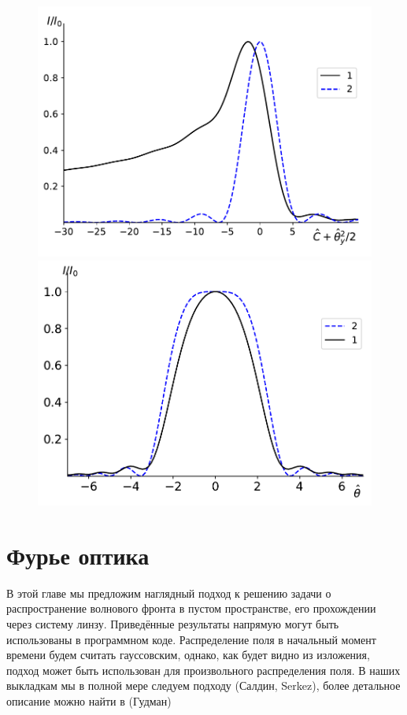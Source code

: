 \documentclass[14pt,a4paper]{extarticle}
\numberwithin{equation}{section}
\begin{document}
\begin{figure}
	\centering  
	\begin{minipage}{0.49\textwidth}
		\centering
		\includegraphics[width=\textwidth]{pic/spec_integ_emittance.pdf}
		\caption{}
		\label{fig:2spec_emittance_and_single}
	\end{minipage}\hfill
	\begin{minipage}{0.49\textwidth}
		\centering
		\includegraphics[width=\textwidth]{pic/angle_integ_emittance.pdf}
		\caption{}
		\label{fig:spec}
	\end{minipage}    
\end{figure}
\section{Фурье оптика}
В этой главе мы предложим наглядный подход к решению задачи о распространение волнового фронта в пустом пространстве, его прохождении через систему линзу. Приведённые результаты напрямую могут быть использованы в программном коде. Распределение поля в начальный момент времени будем считать гауссовским, однако, как будет видно из изложения, подход может быть использован для произвольного распределения поля. В наших выкладкам мы в полной мере следуем подходу (Салдин, Serkez), более детальное описание можно найти в (Гудман)
\end{document}
